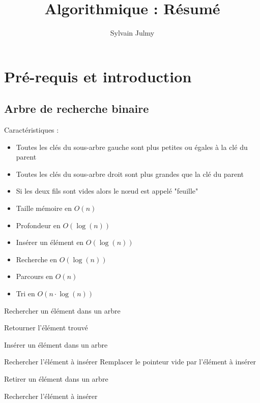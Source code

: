 \documentclass[11pt,a4paper]{report}
\author{Sylvain Julmy}
\title{Algorithmique : Résumé}
\begin{document}
\chapter{Pré-requis et introduction}

\section{Arbre de recherche binaire}
Caractéristiques :
\begin{itemize}
    \item Toutes les clés du sous-arbre gauche sont plus petites ou égales à la clé du parent
    \item Toutes les clés du sous-arbre droit sont plus grandes que la clé du parent
    \item Si les deux fils sont vides alors le nœud est appelé "feuille"
\end{itemize}

\begin{itemize}
    \item Taille mémoire en $O(n)$
    \item Profondeur en $O(\log(n))$
    \item Insérer un élément en $O(\log(n))$
    \item Recherche en $O(\log(n))$
    \item Parcours en $O(n)$
    \item Tri en $O(n\cdot\log(n))$
\end{itemize}

\begin{algorithm}[H]
\caption{Rechercher un élément dans un arbre}
Retourner l'élément trouvé 
\end{algorithm}

\begin{algorithm}[H]
\caption{Insérer un élément dans un arbre}
Rechercher l'élément à insérer 
Remplacer le pointeur vide par l'élément à insérer\;
\end{algorithm}

\begin{algorithm}[H]
\caption{Retirer un élément dans un arbre}
Rechercher l'élément à insérer\;
\end{algorithm}
\end{document}
